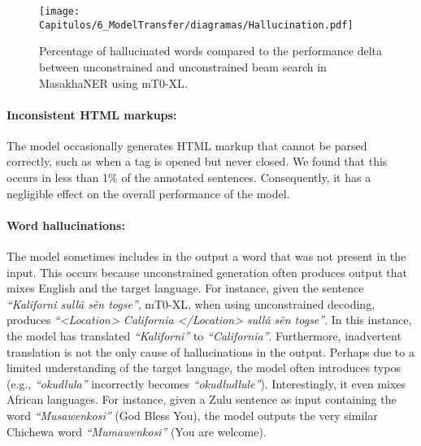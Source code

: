 \begin{figure}[tb]
    \centering
    \texttt{[image: Capitulos/6\_ModelTransfer/diagramas/Hallucination.pdf]}
    \caption{Percentage of hallucinated words compared to the performance delta between unconstrained and unconstrained beam search in MasakhaNER using mT0-XL.}
    \label{fig6:Hallucination}
\end{figure}

\paragraph{Inconsistent HTML markups:} The model occasionally generates HTML markup that cannot be parsed correctly, such as when a tag is opened but never closed. We found that this occurs in less than 1\% of the annotated sentences. Consequently, it has a negligible effect on the overall performance of the model.

\paragraph{Word hallucinations:} The model sometimes includes in the output a word that was not present in the input. This occurs because unconstrained generation often produces output that mixes English and the target language. For instance, given the sentence \textit{``Kaliforni sullã sẽn togse''}, mT0-XL, when using unconstrained decoding, produces \textit{``<Location> California </Location> sullã sẽn togse''}. In this instance, the model has translated \textit{``Kaliforni''} to \textit{``California''}. Furthermore, inadvertent translation is not the only cause of hallucinations in the output. Perhaps due to a limited understanding of the target language, the model often introduces typos (e.g., \textit{``okudlula''} incorrectly becomes \textit{``okudludlule''}). Interestingly, it even mixes African languages. For instance, given a Zulu sentence as input containing the word \textit{``Musawenkosi''} (God Bless You), the model outputs the very similar Chichewa word \textit{``Mumawenkosi''} (You are welcome).

